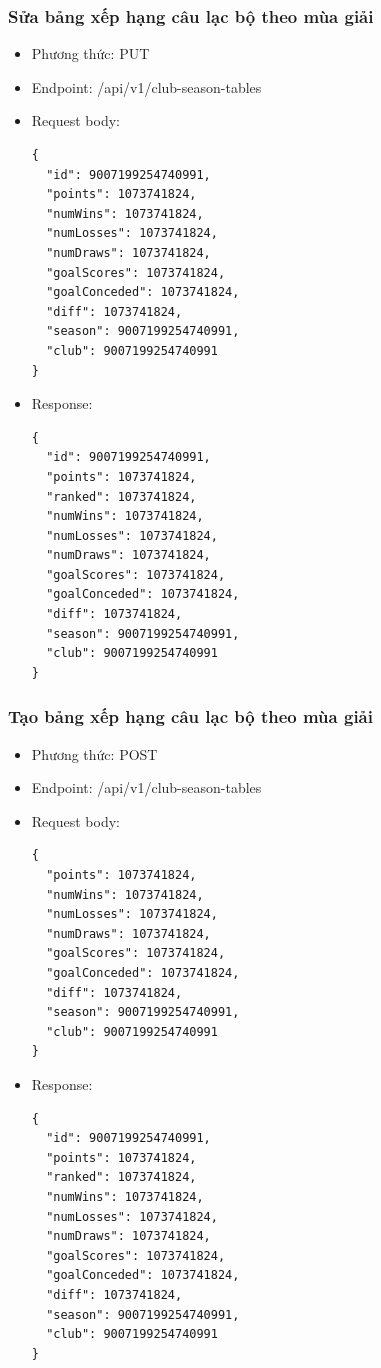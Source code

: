 \documentclass[../BTL.tex]{subfiles}
\begin{document}
\subsubsection{ Sửa bảng xếp hạng câu lạc bộ theo mùa giải}
\begin{itemize}
    \item Phương thức: PUT
    \item Endpoint: /api/v1/club-season-tables
    \item Request body:
        \begin{verbatim}
{
  "id": 9007199254740991,
  "points": 1073741824,
  "numWins": 1073741824,
  "numLosses": 1073741824,
  "numDraws": 1073741824,
  "goalScores": 1073741824,
  "goalConceded": 1073741824,
  "diff": 1073741824,
  "season": 9007199254740991,
  "club": 9007199254740991
}
        \end{verbatim}
    \item Response:
        \begin{verbatim}
{
  "id": 9007199254740991,
  "points": 1073741824,
  "ranked": 1073741824,
  "numWins": 1073741824,
  "numLosses": 1073741824,
  "numDraws": 1073741824,
  "goalScores": 1073741824,
  "goalConceded": 1073741824,
  "diff": 1073741824,
  "season": 9007199254740991,
  "club": 9007199254740991
}
        \end{verbatim}
\end{itemize}

\subsubsection{ Tạo bảng xếp hạng câu lạc bộ theo mùa giải}
\begin{itemize}
    \item Phương thức: POST
    \item Endpoint: /api/v1/club-season-tables
    \item Request body:
        \begin{verbatim}
{
  "points": 1073741824,
  "numWins": 1073741824,
  "numLosses": 1073741824,
  "numDraws": 1073741824,
  "goalScores": 1073741824,
  "goalConceded": 1073741824,
  "diff": 1073741824,
  "season": 9007199254740991,
  "club": 9007199254740991
}
        \end{verbatim}
    \item Response:
        \begin{verbatim}
{
  "id": 9007199254740991,
  "points": 1073741824,
  "ranked": 1073741824,
  "numWins": 1073741824,
  "numLosses": 1073741824,
  "numDraws": 1073741824,
  "goalScores": 1073741824,
  "goalConceded": 1073741824,
  "diff": 1073741824,
  "season": 9007199254740991,
  "club": 9007199254740991
}
        \end{verbatim}
\end{itemize}
\end{document}
